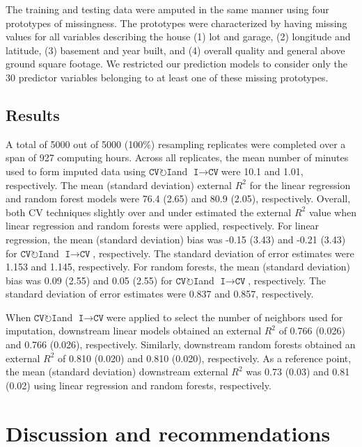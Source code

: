 \documentclass[AMA,STIX1COL,doublespace]{WileyNJD-v2}
\begin{document}
The training and testing data were amputed in the same manner using four
prototypes of missingness. The prototypes were characterized by having
missing values for all variables describing the house (1) lot and
garage, (2) longitude and latitude, (3) basement and year built, and (4)
overall quality and general above ground square footage. We restricted
our prediction models to consider only the 30 predictor variables
belonging to at least one of these missing prototypes.

\subsection{Results}

A total of 5000 out of 5000 (100\%) resampling replicates were completed
over a span of 927 computing hours. Across all replicates, the mean
number of minutes used to form imputed data using
$\texttt{CV}\!\circlearrowright\!\texttt{I}$\space and
$\texttt{I}\!\!\rightarrow\!\texttt{CV}$\space were 10.1 and 1.01,
respectively. The mean (standard deviation) external \(R^2\) for the
linear regression and random forest models were 76.4 (2.65) and 80.9
(2.05), respectively. Overall, both CV techniques slightly over and
under estimated the external \(R^2\) value when linear regression and
random forests were applied, respectively. For linear regression, the
mean (standard deviation) bias was -0.15 (3.43) and -0.21 (3.43) for
$\texttt{CV}\!\circlearrowright\!\texttt{I}$\space and
$\texttt{I}\!\!\rightarrow\!\texttt{CV}$, respectively. The standard
deviation of error estimates were 1.153 and 1.145, respectively. For
random forests, the mean (standard deviation) bias was 0.09 (2.55) and
0.05 (2.55) for $\texttt{CV}\!\circlearrowright\!\texttt{I}$\space and
$\texttt{I}\!\!\rightarrow\!\texttt{CV}$, respectively. The standard
deviation of error estimates were 0.837 and 0.857, respectively.

When $\texttt{CV}\!\circlearrowright\!\texttt{I}$\space and
$\texttt{I}\!\!\rightarrow\!\texttt{CV}$\space were applied to select
the number of neighbors used for imputation, downstream linear models
obtained an external \(R^2\) of 0.766 (0.026) and 0.766 (0.026),
respectively. Similarly, downstream random forests obtained an external
\(R^2\) of 0.810 (0.020) and 0.810 (0.020), respectively. As a reference
point, the mean (standard deviation) downstream external \(R^2\) was
0.73 (0.03) and 0.81 (0.02) using linear regression and random forests,
respectively.

\section{Discussion and recommendations} \label{sec:discuss}
\end{document}
